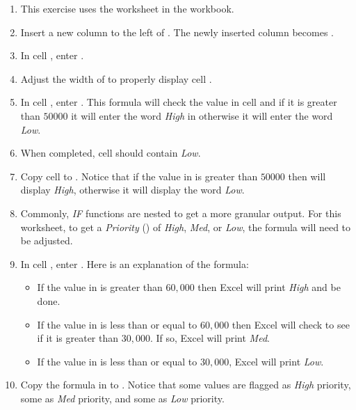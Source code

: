 \begin{enumerate}
	\item This exercise uses the  worksheet in the  workbook.
	\item Insert a new column to the left of . The newly inserted column becomes .
	\item In cell , enter .
	\item Adjust the width of  to properly display cell .
	\item In cell , enter . This formula will check the value in cell  and if it is greater than $ 50000 $ it will enter the word \textit{High} in  otherwise it will enter the word \textit{Low}.
	\item When completed, cell  should contain \textit{Low}.
	\item Copy cell  to . Notice that if the value in  is greater than $ 50000 $ then  will display \textit{High}, otherwise it will display the word \textit{Low}.
	\item Commonly, \textit{IF} functions are nested to get a more granular output. For this worksheet, to get a \textit{Priority} () of \textit{High}, \textit{Med}, or \textit{Low}, the formula will need to be adjusted.
	\item In cell , enter . Here is an explanation of the formula:
	
	\begin{itemize}
		\item If the value in  is greater than $ 60,000 $ then Excel will print \textit{High} and be done.
		\item If the value in  is less than or equal to $ 60,000 $ then Excel will check to see if it is greater than $ 30,000 $. If so, Excel will print \textit{Med}.
		\item If the value in  is less than or equal to $ 30,000 $, Excel will print \textit{Low}.
	\end{itemize}

	\item Copy the formula in  to . Notice that some values are flagged as \textit{High} priority, some as \textit{Med} priority, and some as \textit{Low} priority.
	

\end{enumerate}
